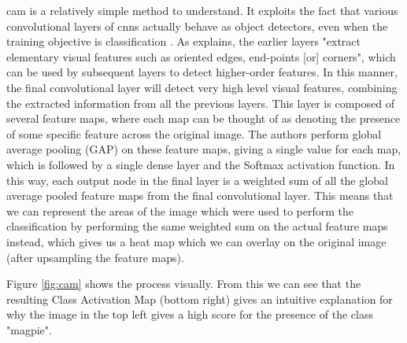 \documentclass[UKenglish]{uiomasterthesis} %
\theoremstyle{definition}
\begin{document}
\ac{cam} is a relatively simple method to understand. It exploits the fact that various convolutional layers of \ac{cnn}s actually behave as object detectors, even when the training objective is classification \cite{cam}. As \cite{lenet5} explains, the earlier layers "extract elementary visual features such as oriented edges, end-points [or] corners", which can be used by subsequent layers to detect higher-order features. In this manner, the final convolutional layer will detect very high level visual features, combining the extracted information from all the previous layers. This layer is composed of several feature maps, where each map can be thought of as denoting the presence of some specific feature across the original image. The authors perform global average pooling (GAP) on these feature maps, giving a single value for each map, which is followed by a single dense layer and the Softmax activation function. In this way, each output node in the final layer is a weighted sum of all the global average pooled feature maps from the final convolutional layer. This means that we can represent the areas of the image which were used to perform the classification by performing the same weighted sum on the actual feature maps instead, which gives us a heat map which we can overlay on the original image (after upsampling the feature maps).

Figure \ref{fig:cam} shows the process visually. From this we can see that the resulting Class Activation Map (bottom right) gives an intuitive explanation for why the image in the top left gives a high score for the presence of the class "magpie".
\end{document}
